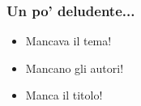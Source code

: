 \begin{frame}
 
 \frametitle{Un po' deludente...}
 
 \begin{itemize}
  \item Mancava il tema!
  \item Mancano gli autori!
  \item Manca il titolo!
 \end{itemize}

\end{frame}
 
